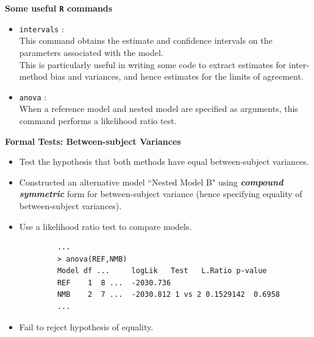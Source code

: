 \documentclass[compress]{beamer}        %
\makeatletter
\newcommand{\tcb}{\textcolor{beamer@blendedblue}}
\makeatother
\begin{document}
		\begin{frame}{\bf \tcb{Some useful \texttt{R} commands}}
			\begin{itemize}
				
				\item \texttt{intervals} :\vspace{0.25cm} \\This command obtains the estimate and confidence intervals on the parameters associated with the model.\\
				This is particularly useful in writing some code to extract estimates for inter-method bias and variances, and hence estimates for the limits of agreement.
				
				\item \texttt{anova} : \vspace{0.25cm} \\When a reference model and nested model are specified as arguments, this command performs a likelihood ratio test.
			\end{itemize}
		\end{frame}
		
		
		\begin{frame}[fragile]{\bf \tcb{Formal Tests: Between-subject Variances}}
			\begin{itemize}
				\item Test the hypothesis that both methods have equal between-subject variances.
				\item Constructed an alternative model ``Nested Model B" using \textbf{\emph{compound symmetric}} form for between-subject variance (hence specifying equality of between-subject variances).
				\item Use a likelihood ratio test to compare models.
			\end{itemize}
			\begin{verbatim}
			...
			> anova(REF,NMB)
			Model df ...     logLik   Test   L.Ratio p-value
			REF    1  8 ...  -2030.736
			NMB    2  7 ...  -2030.812 1 vs 2 0.1529142  0.6958
			...
			\end{verbatim}
			\begin{itemize}
				\item Fail to reject hypothesis of equality.
			\end{itemize}
		\end{frame}
		
\end{document}
